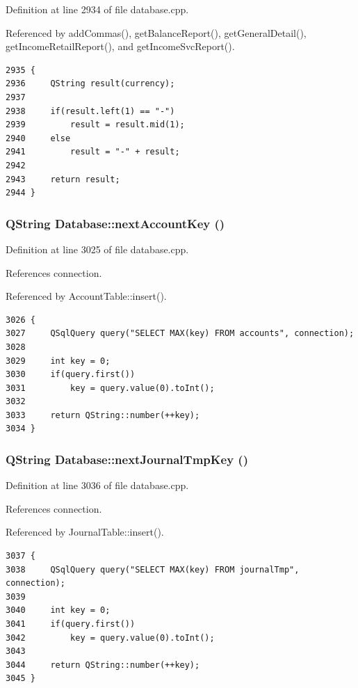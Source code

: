 Definition at line 2934 of file database.cpp.

Referenced by add\-Commas(), get\-Balance\-Report(), get\-General\-Detail(), get\-Income\-Retail\-Report(), and get\-Income\-Svc\-Report().

\footnotesize\begin{verbatim}2935 {
2936     QString result(currency);
2937 
2938     if(result.left(1) == "-")
2939         result = result.mid(1);
2940     else
2941         result = "-" + result;
2942 
2943     return result;
2944 }
\end{verbatim}\normalsize 


\hypertarget{classDatabase_a52}{
\subsubsection[nextAccountKey]{\setlength{\rightskip}{0pt plus 5cm}QString Database::next\-Account\-Key ()}}
\label{classDatabase_a52}


Definition at line 3025 of file database.cpp.

References connection.

Referenced by Account\-Table::insert().

\footnotesize\begin{verbatim}3026 {
3027     QSqlQuery query("SELECT MAX(key) FROM accounts", connection);
3028     
3029     int key = 0;
3030     if(query.first())
3031         key = query.value(0).toInt();
3032     
3033     return QString::number(++key);
3034 }
\end{verbatim}\normalsize 


\hypertarget{classDatabase_a53}{
\subsubsection[nextJournalTmpKey]{\setlength{\rightskip}{0pt plus 5cm}QString Database::next\-Journal\-Tmp\-Key ()}}
\label{classDatabase_a53}


Definition at line 3036 of file database.cpp.

References connection.

Referenced by Journal\-Table::insert().

\footnotesize\begin{verbatim}3037 {
3038     QSqlQuery query("SELECT MAX(key) FROM journalTmp", connection);
3039     
3040     int key = 0;
3041     if(query.first())
3042         key = query.value(0).toInt();
3043     
3044     return QString::number(++key);
3045 }
\end{verbatim}\normalsize 


